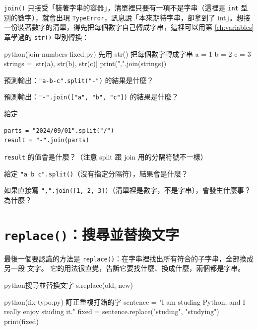 \texttt{join()} 只接受「裝著字串的容器」，清單裡只要有一項不是字串（這裡是 \texttt{int}
型別的數字），就會出現 \texttt{TypeError}，訊息說「本來期待字串，卻拿到了 int」。想接
一份裝著數字的清單，得先把每個數字自己轉成字串，這裡可以用第 \ref{ch:variables} 章學過的 \texttt{str()}
型別轉換：

\begin{example}{python}{(join-numbers-fixed.py) 先用 str() 把每個數字轉成字串}
a = 1
b = 2
c = 3
strings = [str(a), str(b), str(c)]
print(",".join(strings))
\end{example}


\begin{drills}[label=drills:split-join]
\item 預測輸出：\texttt{"a-b-c".split("-")} 的結果是什麼？
\item 預測輸出：\texttt{"-".join(["a", "b", "c"])} 的結果是什麼？
\item 給定
\begin{verbatim}
parts = "2024/09/01".split("/")
result = "-".join(parts)
\end{verbatim}
\texttt{result} 的值會是什麼？（注意 split 跟 join 用的分隔符號不一樣）
\item 給定 \texttt{"a  b   c".split()}（沒有指定分隔符），結果會是什麼？
\item 如果直接寫 \texttt{",".join([1, 2, 3])}（清單裡是數字，不是字串），會發生什麼事？
為什麼？
\end{drills}

\section{\texttt{replace()}：搜尋並替換文字}
\label{sec:replace-method}

最後一個要認識的方法是 \texttt{replace()}：在字串裡找出所有符合的子字串，全部換成另一段
文字。
它的用法很直覺，告訴它要找什麼、換成什麼，兩個都是字串。

\begin{code}{python}{搜尋並替換文字}
s.replace(old, new)
\end{code}

\begin{example}{python}{(fix-typo.py) 訂正重複打錯的字}
sentence = "I am studing Python, and I really enjoy studing it."
fixed = sentence.replace("studing", "studying")
print(fixed)
\end{example}

